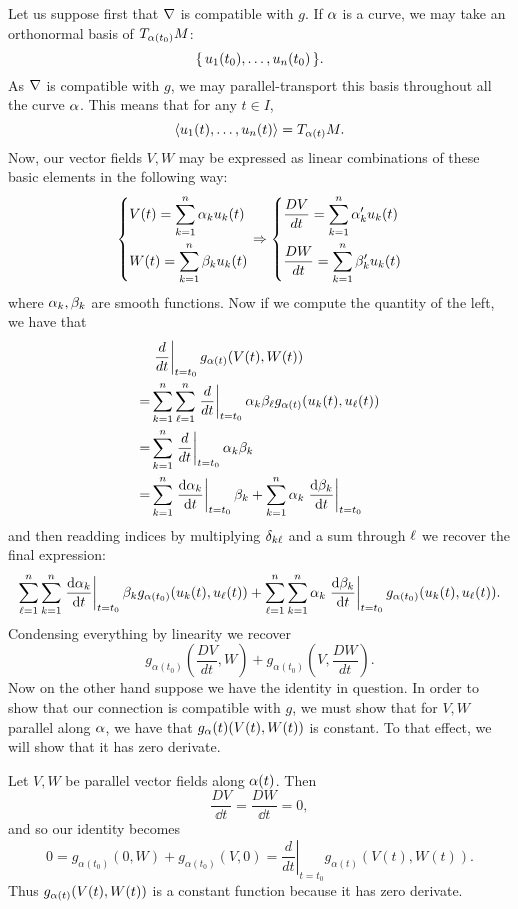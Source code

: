 \documentclass[12pt]{memoir}
\begin{document}
\begin{ptcbr}
Let us suppose first that $\nabla$ is compatible with $g$. If $\alpha$ is a curve, we may take an orthonormal basis of $T_{\alpha(t_0)}M$:
$$\{\,u_1(t_0),\dots,u_n(t_0)\,\}.$$
As $\nabla$ is compatible with $g$, we may parallel-transport this basis throughout all the curve $\alpha$. This means that for any $t\in I$, 
$$\left\langle u_1(t),\dots,u_n(t)\right\rangle=T_{\alpha(t)}M.$$
Now, our vector fields $V,W$ may be expressed as linear combinations of these basic elements in the following way:
$$
\left\lbrace
\begin{aligned}
	&V(t)=\sum_{k=1}^n\alpha_ku_k(t)\\
	&W(t)=\sum_{k=1}^n\beta_ku_k(t)
\end{aligned}
\right.\Rightarrow
\left\lbrace
\begin{aligned}
	&\frac{DV}{dt}=\sum_{k=1}^n\alpha_k'u_k(t)\\
	&\frac{DW}{dt}=\sum_{k=1}^n\beta_k'u_k(t)
\end{aligned}
\right.
$$
where $\alpha_k,\beta_k$ are smooth functions. Now if we compute the quantity of the left, we have that 
\begin{align*}
	&\left.\frac{d}{dt}\right|_{t=t_0} g_{\alpha(t)}(V(t),W(t))\\
	=&\sum_{k=1}^{n}\sum_{\ell=1}^{n}\left.\frac{d}{dt}\right|_{t=t_0}\alpha_k\beta_\ell g_{\alpha(t)}(u_k(t),u_\ell(t))\\
	=&\sum_{k=1}^{n}\left.\frac{d}{dt}\right|_{t=t_0}\alpha_k\beta_k\\
	=&\sum_{k=1}^{n}\left.\dv{\alpha_k}{t}\right|_{t=t_0}\beta_k+\sum_{k=1}^{n}\alpha_k\left.\dv{\beta_k}{t}\right|_{t=t_0}\\
\end{align*}
and then readding indices by multiplying $\delta_{k\ell}$ and a sum through $\ell$ we recover the final expression:
$$\sum_{\ell=1}^n\sum_{k=1}^{n}\left.\dv{\alpha_k}{t}\right|_{t=t_0}\beta_kg_{\alpha(t_0)}(u_k(t),u_\ell(t))+\sum_{\ell=1}^n\sum_{k=1}^{n}\alpha_k\left.\dv{\beta_k}{t}\right|_{t=t_0}g_{\alpha(t_0)}(u_k(t),u_\ell(t)).$$
Condensing everything by linearity we recover
$$g_{\alpha(t_0)} \left(\frac{DV}{dt},W\right) + g_{\alpha(t_0)} \left(V,\frac{DW}{dt}\right).$$
Now on the other hand suppose we have the identity in question. In order to show that our connection is compatible with $g$, we must show that for $V,W$ parallel along $\alpha$, we have that $g_\alpha(t)(V(t),W(t))$ is constant. To that effect, we will show that it has zero derivate.\par
Let $V,W$ be parallel vector fields along $\alpha(t)$. Then 
$$\frac{DV}{\dd t}=\frac{DW}{\dd t}=0,$$
and so our identity becomes
$$ 0=g_{\alpha(t_0)} \left(0,W\right) + g_{\alpha(t_0)} \left(V,0\right)=\left.\frac{d}{dt}\right|_{t=t_0} g_{\alpha(t)}(V(t),W(t)).$$
Thus $g_{\alpha(t)}(V(t),W(t))$ is a constant function because it has zero derivate.
\end{ptcbr}
\end{document}
